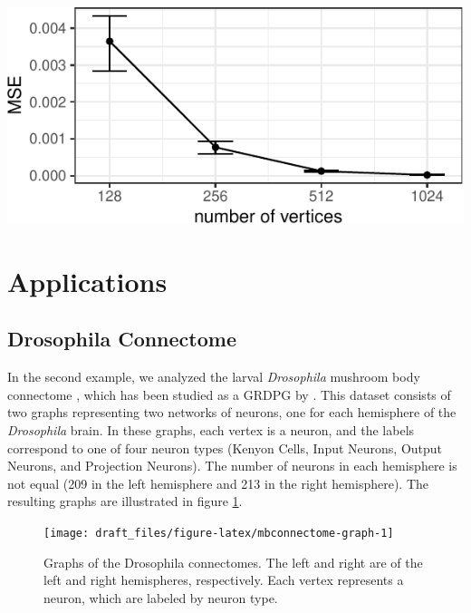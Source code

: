 \documentclass[12pt]{article}
\begin{document}
\begin{center}\includegraphics{draft_files/figure-latex/angle-reg-results-1} \end{center}

\hypertarget{applications}{%
\section{Applications}\label{applications}}

\hypertarget{drosophila-connectome}{%
\subsection{Drosophila Connectome}\label{drosophila-connectome}}

In the second example, we analyzed the larval \emph{Drosophila} mushroom
body connectome \citep{Eichler141762}, which has been studied as a GRDPG
by \citet{athreya2020estimation}. This dataset consists of two graphs
representing two networks of neurons, one for each hemisphere of the
\emph{Drosophila} brain. In these graphs, each vertex is a neuron, and
the labels correspond to one of four neuron types (Kenyon Cells, Input
Neurons, Output Neurons, and Projection Neurons). The number of neurons
in each hemisphere is not equal (209 in the left hemisphere and 213 in
the right hemisphere). The resulting graphs are illustrated in figure
\ref{fig:mbconnectome-graph}.

\begin{figure}[H]

{\centering \texttt{[image: draft\_files/figure-latex/mbconnectome-graph-1]} 

}

\caption{Graphs of the Drosophila connectomes. The left and right are of the left and right hemispheres, respectively. Each vertex represents a neuron, which are labeled by neuron type.}\label{fig:mbconnectome-graph}
\end{figure}
\end{document}
